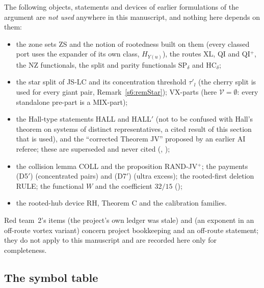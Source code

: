 \begin{remark}\label{s1:remNotUsed}
The following objects, statements and devices of earlier formulations of the
argument are \emph{not used} anywhere in this manuscript, and nothing here depends
on them:
\begin{itemize}
\item the zone sets ZS and the notion of rootedness built on them (every classed
port uses the expander of its own class, $H_{Y(u)}$), the routes XL, QI and
QI$^+$, the NZ functionals, the split and parity functionals SP$_\delta$ and
HC$_\delta$;
\item the star split of JS-LC and its concentration threshold $\tau'_l$ (the
cherry split is used for every giant pair, Remark~\ref{s6:remStar}); VX-parts
(here $\mathcal V=\emptyset$: every standalone pre-part is a MIX-part);
\item the Hall-type statements HALL and HALL$'$ (not to be confused with Hall's
theorem on systems of distinct representatives, a cited result of this
section that is used), and the ``corrected Theorem JV''
proposed by an earlier AI referee; these are superseded and never cited
(, );
\item the collision lemma COLL and the proposition RAND-JV$^+$; the payments
(D5$'$) (concentrated pairs) and (D7$'$) (ultra excess); the rooted-first
deletion RULE; the functional $W$ and the coefficient $32/15$ ();
\item the rooted-hub device RH, Theorem C and the calibration families.
\end{itemize}
Red team~2's items  (the project's own ledger was stale) and
 (an exponent in an off-route vortex variant) concern project
bookkeeping and an off-route statement; they do not apply to this manuscript and
are recorded here only for completeness.
\end{remark}

\subsection{The symbol table}\label{s1:ssecSymbols}

